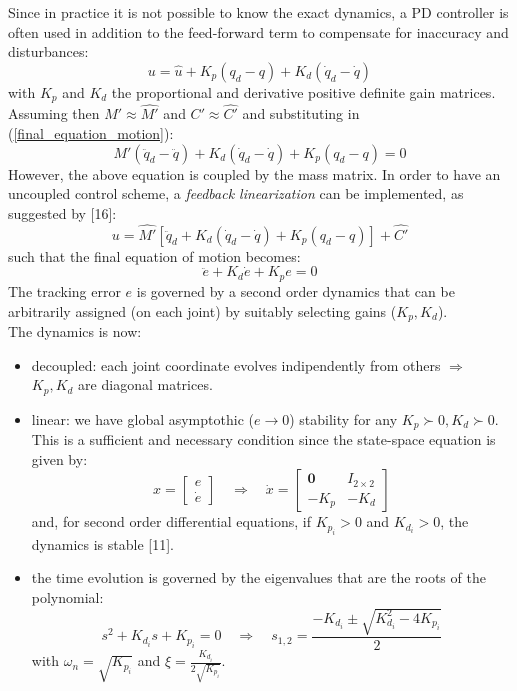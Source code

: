 \documentclass[a4paper,12pt,oneside]{report}
\begin{document}
Since in practice it is not possible to know the exact dynamics, a PD controller is often used in addition to the feed-forward term to compensate for inaccuracy and disturbances:
\begin{equation}
  u=\hat{u}+K_p(q_d-q)+K_d(\dot{q}_d-\dot{q})
\end{equation}
with $K_p$ and $K_d$ the proportional and derivative positive definite gain matrices.\\
Assuming then $M'\approx\hat{M'}$ and $C'\approx\hat{C'}$ and substituting in (\ref{final_equation_motion}):
\begin{equation}
  M'(\ddot{q}_d-\ddot{q})+K_d(\dot{q}_d-\dot{q})+K_p(q_d-q)=0
\end{equation}
However, the above equation is coupled by the mass matrix. In order to have an uncoupled control scheme, a \textit{feedback linearization} can be implemented, as suggested by [16]:
\begin{equation}
  u=\hat{M'}[\ddot{q}_d+K_d(\dot{q}_d-\dot{q})+K_p(q_d-q)]+\hat{C'}
  \label{feedback_linearization}
\end{equation}
such that the final equation of motion becomes:
\begin{equation}
  \ddot{e}+K_d\dot{e}+K_pe=0
  \label{controlled_dynamics}
\end{equation}
The tracking error $e$ is governed by a second order dynamics that can be arbitrarily assigned (on each joint) by suitably selecting gains ($K_p,K_d$).\\
The dynamics is now:
\begin{itemize}
  \item decoupled: each joint coordinate evolves indipendently from others $\Rightarrow$ $K_p,K_d$ are diagonal matrices.
  \item linear: we have global asymptothic ($e\rightarrow 0$) stability for any $K_p\succ 0,K_d\succ 0$. This is a sufficient and necessary condition since the state-space equation is given by:
    \begin{equation}
      x=\begin{bmatrix}
        e\\\dot{e}
      \end{bmatrix}\quad \Rightarrow \quad \dot{x}=\begin{bmatrix}
        \mathbf{0}&I_{2\times 2}\\
        -K_p&-K_d
      \end{bmatrix}
    \end{equation}
    and, for second order differential equations, if $K_{p_i}>0$ and $K_{d_i}>0$, the dynamics is stable [11].
  \item the time evolution is governed by the eigenvalues that are the roots of the polynomial:
    \begin{equation}
      s^2+K_{d_i}s+K_{p_i}=0 \quad \Rightarrow \quad s_{1,2}=\frac{-K_{d_i}\pm \sqrt{K_{d_i}^2-4K_{p_i}}}{2}
    \end{equation}
    with $\omega_n=\sqrt{K_{p_i}}$ and $\xi=\frac{K_{d_i}}{2\sqrt{K_{p_i}}}$.
\end{itemize}
\end{document}
